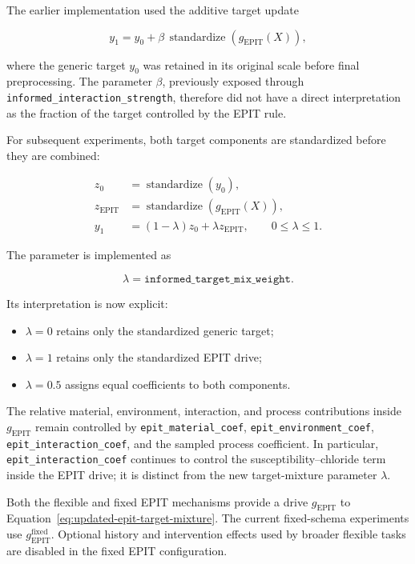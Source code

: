 \documentclass{article}
\begin{document}
The earlier implementation used the additive target update

\[
y_1
=
y_0
+
\beta\,
\operatorname{standardize}
\left(
g_{\mathrm{EPIT}}(X)
\right),
\]

where the generic target \(y_0\) was retained in its original scale before final
preprocessing. The parameter \(\beta\), previously exposed through
\texttt{informed\_interaction\_strength}, therefore did not have a direct
interpretation as the fraction of the target controlled by the EPIT rule.

For subsequent experiments, both target components are standardized before they
are combined:

\begin{equation}
\begin{aligned}
z_0
&=
\operatorname{standardize}(y_0),\\
z_{\mathrm{EPIT}}
&=
\operatorname{standardize}
\left(
g_{\mathrm{EPIT}}(X)
\right),\\
y_1
&=
(1-\lambda)z_0
+
\lambda z_{\mathrm{EPIT}},
\qquad
0\leq\lambda\leq1.
\end{aligned}
\label{eq:updated-epit-target-mixture}
\end{equation}

The parameter is implemented as

\[
\lambda
=
\texttt{informed\_target\_mix\_weight}.
\]

Its interpretation is now explicit:

\begin{itemize}
    \item \(\lambda=0\) retains only the standardized generic target;
    \item \(\lambda=1\) retains only the standardized EPIT drive;
    \item \(\lambda=0.5\) assigns equal coefficients to both components.
\end{itemize}

The relative material, environment, interaction, and process contributions
inside \(g_{\mathrm{EPIT}}\) remain controlled by
\texttt{epit\_material\_coef},
\texttt{epit\_environment\_coef},
\texttt{epit\_interaction\_coef}, and the sampled process coefficient.
In particular, \texttt{epit\_interaction\_coef} continues to control the
susceptibility--chloride term inside the EPIT drive; it is distinct from the
new target-mixture parameter \(\lambda\).

Both the flexible and fixed EPIT mechanisms provide a drive
\(g_{\mathrm{EPIT}}\) to Equation~\eqref{eq:updated-epit-target-mixture}.
The current fixed-schema experiments use
\(g_{\mathrm{EPIT}}^{\mathrm{fixed}}\). Optional history and intervention effects
used by broader flexible tasks are disabled in the fixed EPIT configuration.
\end{document}
